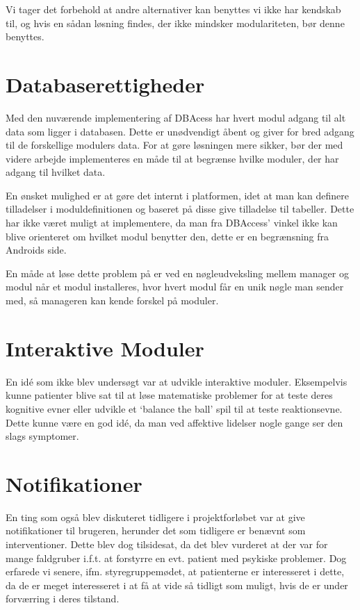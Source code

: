 Vi tager det forbehold at andre alternativer kan benyttes vi ikke har kendskab til, og hvis en sådan løsning findes, der ikke mindsker modulariteten, bør denne benyttes.

\section{Databaserettigheder}\label{databaserettigheder}
Med den nuværende implementering af DBAcess har hvert modul adgang til alt data som ligger i databasen.
Dette er unødvendigt åbent og giver for bred adgang til de forskellige modulers data.
For at gøre løsningen mere sikker, bør der med videre arbejde implementeres en måde til at begrænse hvilke moduler, der har adgang til hvilket data.

En ønsket mulighed er at gøre det internt i platformen, idet at man kan definere tilladelser i moduldefinitionen og baseret på disse give tilladelse til tabeller. 
Dette har ikke været muligt at implementere, da man fra DBAccess' vinkel ikke kan blive orienteret om hvilket modul benytter den, dette er en begrænsning fra Androids side.

En måde at løse dette problem på er ved en nøgleudveksling mellem manager og modul når et modul installeres, hvor hvert modul får en unik nøgle man sender med, så manageren kan kende forskel på moduler.


\section{Interaktive Moduler}
En idé som ikke blev undersøgt var at udvikle interaktive moduler.
Eksempelvis kunne patienter blive sat til at løse matematiske problemer for at teste deres kognitive evner eller udvikle et `balance the ball' spil til at teste reaktionsevne.
Dette kunne være en god idé, da man ved affektive lidelser nogle gange ser den slags symptomer.

\section{Notifikationer}
En ting som også blev diskuteret tidligere i projektforløbet var at give notifikationer til brugeren, herunder det som tidligere er benævnt som interventioner.
Dette blev dog tilsidesat, da det blev vurderet at der var for mange faldgruber i.f.t. at forstyrre en evt. patient med psykiske problemer.
Dog erfarede vi senere, ifm. styregruppemødet, at patienterne er interesseret i dette, da de er meget interesseret i at få at vide så tidligt som muligt, hvis de er under forværring i deres tilstand.

